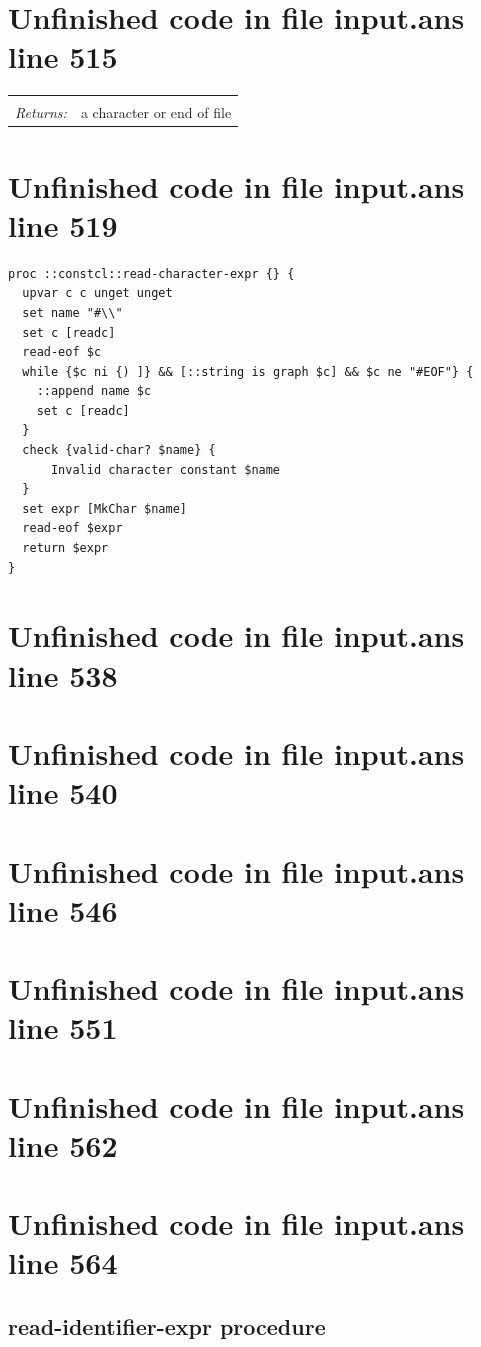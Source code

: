 \documentclass[twoside,9pt]{report}
\begin{document}
\section{Unfinished code in file input.ans line 515}
\noindent\begin{tabular}{ |p{1.9cm} p{8cm}| }
\hline
\rowcolor[HTML]{CCCCCC} \multicolumn{2}{|l|}{\bf read-character-expr (internal)} \\
\textit{Returns:} & a character or end of file \\
\hline
\end{tabular}
\section{Unfinished code in file input.ans line 519}
\begin{lstlisting}
proc ::constcl::read-character-expr {} {
  upvar c c unget unget
  set name "#\\"
  set c [readc]
  read-eof $c
  while {$c ni {) ]} && [::string is graph $c] && $c ne "#EOF"} {
    ::append name $c
    set c [readc]
  }
  check {valid-char? $name} {
      Invalid character constant $name
  }
  set expr [MkChar $name]
  read-eof $expr
  return $expr
}
\end{lstlisting}
\section{Unfinished code in file input.ans line 538}
\section{Unfinished code in file input.ans line 540}
\section{Unfinished code in file input.ans line 546}
\section{Unfinished code in file input.ans line 551}
\section{Unfinished code in file input.ans line 562}
\section{Unfinished code in file input.ans line 564}
\subsection{read-identifier-expr procedure}
\label{read-identifier-expr-procedure}
\end{document}
